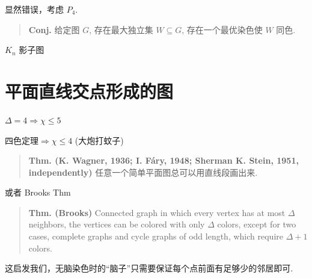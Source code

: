 显然错误，考虑 $P_4$.

\begin{quotation}
\textbf{Conj.} 给定图 $G$, 存在最大独立集 $W\subseteq G$, 存在一个最优染色使 $W$ 同色.
\end{quotation}

$K_n$ 影子图

\section{平面直线交点形成的图}


$\Delta=4\Rightarrow\chi\leq 5$

四色定理$\Rightarrow\chi\leq4$ (大炮打蚊子)

\begin{quotation}
\textbf{Thm. (K. Wagner, 1936; I. Fáry, 1948; Sherman K. Stein, 1951, independently)} 任意一个简单平面图总可以用直线段画出来.
\end{quotation}

或者 Brooks Thm

\begin{quotation}
\textbf{Thm. (Brooks)} Connected graph in which every vertex has at most $\Delta$ neighbors, the vertices can be colored with only $\Delta$ colors, except for two cases, complete graphs and cycle graphs of odd length, which require $\Delta+1$ colors.
\end{quotation}

这启发我们，无脑染色时的“脑子”只需要保证每个点前面有足够少的邻居即可.
